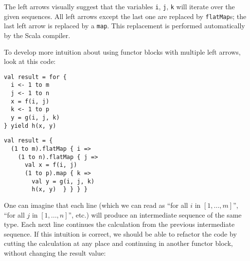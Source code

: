 \vspace{0.2\baselineskip}
The left arrows visually suggest that the variables \lstinline!i!,
\lstinline!j!, \lstinline!k! will iterate over the given sequences.
All left arrows except the last one are replaced by \lstinline!flatMap!s;
the last left arrow is replaced by a \lstinline!map!. This replacement
is performed automatically by the Scala compiler.

To develop more intuition about using functor blocks with multiple
left arrows, look at this code:

\noindent \texttt{\textcolor{blue}{\footnotesize{}}}%
\begin{minipage}[c]{0.475\columnwidth}%
\texttt{\textcolor{blue}{\footnotesize{}}}
\begin{lstlisting}
val result = for {
  i <- 1 to m
  j <- 1 to n
  x = f(i, j)
  k <- 1 to p
  y = g(i, j, k)
} yield h(x, y)
\end{lstlisting}
%
\end{minipage}\texttt{\textcolor{blue}{\footnotesize{}\hspace*{\fill}}}%
\begin{minipage}[c]{0.475\columnwidth}%
\texttt{\textcolor{blue}{\footnotesize{}}}
\begin{lstlisting}
val result = {
  (1 to m).flatMap { i =>
    (1 to n).flatMap { j =>
      val x = f(i, j)
      (1 to p).map { k =>
        val y = g(i, j, k)
        h(x, y)  } } } }
\end{lstlisting}
%
\end{minipage}{\footnotesize\par}

\vspace{0.2\baselineskip}
One can imagine that each line (which we can read as ``for all $i$
in $\left[1,...,m\right]$'', ``for all $j$ in $\left[1,...,n\right]$'',
etc.) will produce an intermediate sequence of the same type. Each
next line continues the calculation from the previous intermediate
sequence. If this intuition is correct, we should be able to refactor
the code by cutting the calculation at any place and continuing in
another functor block, without changing the result value:


